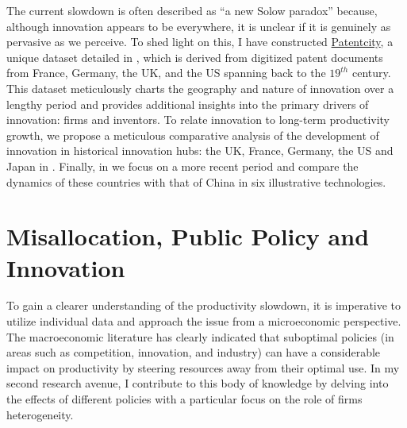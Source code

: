 \documentclass[12pt]{article}
\begin{document}
The current slowdown is often described as ``a new Solow paradox'' because, although innovation appears to be everywhere, it is unclear if it is genuinely as pervasive as we perceive. To shed light on this, I have constructed \href{https://cverluise.github.io/patentcity/}{Patentcity}, a unique dataset detailed in \citet{bergeaud2022new}, which is derived from digitized patent documents from France, Germany, the UK, and the US spanning back to the $19^{th}$ century. This dataset meticulously charts the geography and nature of innovation over a lengthy period and provides additional insights into the primary drivers of innovation: firms and inventors. To relate innovation to long-term productivity growth, we propose a meticulous comparative analysis of the development of innovation in historical innovation hubs: the UK, France, Germany, the US and Japan in \citet*{ruveyda}. Finally, in \citet*{bergeaud2022rise} we focus on a more recent period and compare the dynamics of these countries with that of China in six illustrative technologies.

\section*{Misallocation, Public Policy and Innovation}

To gain a clearer understanding of the productivity slowdown, it is imperative to utilize individual data and approach the issue from a microeconomic perspective. The macroeconomic literature has clearly indicated that suboptimal policies (in areas such as competition, innovation, and industry) can have a considerable impact on productivity by steering resources away from their optimal use. In my second research avenue, I contribute to this body of knowledge by delving into the effects of different policies with a particular focus on the role of firms heterogeneity.
\end{document}
